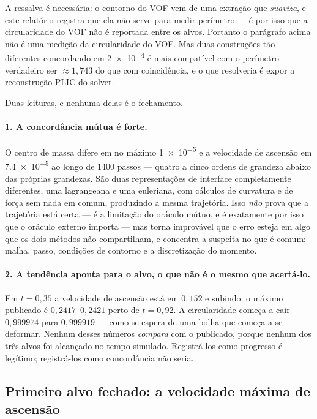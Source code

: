 A ressalva \'e necess\'aria: o contorno do VOF vem de uma extra\c{c}\~ao que
\emph{suaviza}, e este relat\'orio registra que ela n\~ao serve para medir
per\'imetro --- \'e por isso que a circularidade do VOF n\~ao \'e reportada entre
os alvos. Portanto o par\'agrafo acima n\~ao \'e uma medi\c{c}\~ao da
circularidade do VOF. Mas duas constru\c{c}\~oes t\~ao diferentes concordando em
\num{2e-4} \'e mais compat\'ivel com o per\'imetro verdadeiro ser $\approx 1{,}743$
do que com coincid\^encia, e o que resolveria \'e expor a reconstru\c{c}\~ao PLIC
do solver.

Duas leituras, e nenhuma delas \'e o fechamento.

\paragraph{1. A concord\^ancia m\'utua \'e forte.} O centro de massa difere em
no m\'aximo \num{1e-5} e a velocidade de ascens\~ao em \num{7.4e-5} ao longo de
1400 passos --- quatro a cinco ordens de grandeza abaixo das pr\'oprias
grandezas. S\~ao duas representa\c{c}\~oes de interface completamente diferentes,
uma lagrangeana e uma euleriana, com c\'alculos de curvatura e de for\c{c}a sem
nada em comum, produzindo a mesma trajet\'oria. Isso \emph{n\~ao} prova que a
trajet\'oria est\'a certa --- \'e a limita\c{c}\~ao do or\'aculo m\'utuo, e \'e
exatamente por isso que o or\'aculo externo importa --- mas torna improv\'avel
que o erro esteja em algo que os dois m\'etodos n\~ao compartilham, e concentra
a suspeita no que \'e comum: malha, passo, condi\c{c}\~oes de contorno e a
discretiza\c{c}\~ao do momento.

\paragraph{2. A tend\^encia aponta para o alvo, o que n\~ao \'e o mesmo que
acert\'a-lo.} Em $t=0{,}35$ a velocidade de ascens\~ao est\'a em $0{,}152$ e
subindo; o m\'aximo publicado \'e $0{,}2417$--$0{,}2421$ perto de $t=0{,}92$. A
circularidade come\c{c}a a cair --- $0{,}999974$ para $0{,}999919$ --- como se
espera de uma bolha que come\c{c}a a se deformar. Nenhum desses n\'umeros
\emph{compara} com o publicado, porque nenhum dos tr\^es alvos foi alcan\c{c}ado
no tempo simulado. Registr\'a-los como progresso \'e leg\'itimo; registr\'a-los
como concord\^ancia n\~ao seria.

\subsection{Primeiro alvo fechado: a velocidade m\'axima de ascens\~ao}
\label{sec:vcmax}

